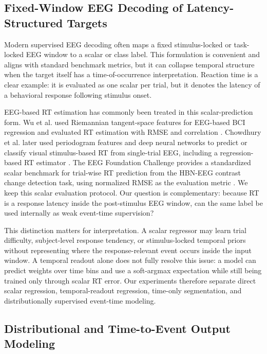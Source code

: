 \subsection{Fixed-Window EEG Decoding of Latency-Structured Targets}

Modern supervised EEG decoding often maps a fixed stimulus-locked or task-locked EEG window to a scalar or class label. This formulation is convenient and aligns with standard benchmark metrics, but it can collapse temporal structure when the target itself has a time-of-occurrence interpretation. Reaction time is a clear example: it is evaluated as one scalar per trial, but it denotes the latency of a behavioral response following stimulus onset.

EEG-based RT estimation has commonly been treated in this scalar-prediction form. Wu et al. used Riemannian tangent-space features for EEG-based BCI regression and evaluated RT estimation with RMSE and correlation \citep{Wu2017ReactionTimeRiemannian}. Chowdhury et al. later used periodogram features and deep neural networks to predict or classify visual stimulus-based RT from single-trial EEG, including a regression-based RT estimator \citep{Chowdhury2020DNNReactionTime}. The EEG Foundation Challenge provides a standardized scalar benchmark for trial-wise RT prediction from the HBN-EEG contrast change detection task, using normalized RMSE as the evaluation metric \citep{Aristimunha2025,EEGChallenge2025}. We keep this scalar evaluation protocol. Our question is complementary: because RT is a response latency inside the post-stimulus EEG window, can the same label be used internally as weak event-time supervision?

This distinction matters for interpretation. A scalar regressor may learn trial difficulty, subject-level response tendency, or stimulus-locked temporal priors without representing where the response-relevant event occurs inside the input window. A temporal readout alone does not fully resolve this issue: a model can predict weights over time bins and use a soft-argmax expectation while still being trained only through scalar RT error. Our experiments therefore separate direct scalar regression, temporal-readout regression, time-only segmentation, and distributionally supervised event-time modeling.

\subsection{Distributional and Time-to-Event Output Modeling}

